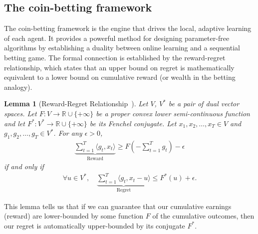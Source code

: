 \documentclass[journal]{IEEEtran} %
\newtheorem{lemma}{Lemma}
\newcommand{\br}[1]{\left(#1\right)}
\begin{document}
\subsection{The coin-betting framework}
The coin-betting framework is the engine that drives the local, adaptive learning of each agent.
It provides a powerful method for designing parameter-free algorithms by establishing a duality between online learning and a sequential betting game.
The formal connection is established by the reward-regret relationship, which states that an upper bound on regret is mathematically equivalent to a lower bound on cumulative reward (or wealth in the betting analogy).

\begin{lemma}[Reward-Regret Relationship~\cite{mcmahan_unconstrained_2014}]\label{lemma:reward-regret}
    Let $V$, $V^*$ be a pair of dual vector spaces.
    Let $F: V \to \mathbb{R} \cup \{+\infty\}$ be a proper convex lower semi-continuous function and let $F^*: V^* \to \mathbb{R} \cup \{+\infty\}$ be its Fenchel conjugate.
    Let $x_1, x_2, \dots, x_T \in V$ and $g_1, g_2, \dots, g_T \in V^*$.
    For any $\epsilon > 0$,
    \begin{align}
        \underbrace{\sum_{t=1}^T \langle g_t, x_t \rangle}_{\text{Reward}} \geq F\br{-\sum_{t=1}^T g_t } - \epsilon
    \end{align}
    if and only if
    \begin{align}
        \forall u \in V^*, \quad \underbrace{\sum_{t=1}^T \langle g_t, x_t - u \rangle}_{\text{Regret}} \leq F^*(u) + \epsilon.
    \end{align}
\end{lemma}
This lemma tells us that if we can guarantee that our cumulative earnings (reward) are lower-bounded by some function $F$ of the cumulative outcomes, then our regret is automatically upper-bounded by its conjugate $F^*$.
\end{document}
